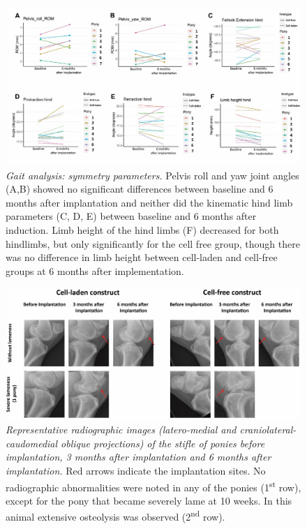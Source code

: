 \documentclass[twocolumn, serif, empirical, authordate, seplic]{jote-article}
\begin{document}
\begin{figure}
\centering \includegraphics[width=\columnwidth]{articles/empirical/horse/media/image12.jpg}
\caption{\emph{Gait analysis: symmetry parameters.}
 Pelvis roll and yaw joint angles (A,B) showed no significant differences between baseline and 6 months after implantation and neither did the kinematic hind limb parameters (C, D, E) between baseline and 6 months after induction. Limb height of the hind limbs (F) decreased for both hindlimbs, but only significantly for the cell free group, though there was no difference in limb height between cell-laden and cell-free groups at 6 months after implementation.}
\label{fig:sup1}\end{figure}



\begin{figure}
\centering \includegraphics[width=\columnwidth]{articles/empirical/horse/media/image13.jpg}
\caption{\emph{Representative radiographic images (latero-medial and craniolateral-caudomedial oblique projections) of the stifle of ponies before implantation, 3 months after implantation and 6 months after implantation.}  Red arrows indicate the implantation sites. No radiographic abnormalities were noted in any of the ponies (1\textsuperscript{st} row), except for the pony that became severely lame at 10 weeks. In this animal extensive osteolysis was observed (2\textsuperscript{nd} row).}
\label{fig:sup2}\end{figure}
\end{document}
